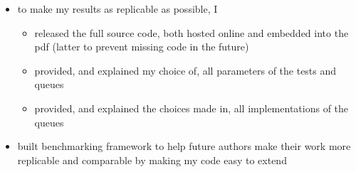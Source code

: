 \begin{itemize}
    \item to make my results as replicable as possible, I
        \begin{itemize}
            \item released the full source code, both hosted online and embedded into the pdf
                (latter to prevent missing code in the future)
            \item provided, and explained my choice of, all parameters of the tests and queues
            \item provided, and explained the choices made in, all implementations of the queues
        \end{itemize}
    \item built benchmarking framework to help future authors make their work more replicable and comparable
        by making my code easy to extend
\end{itemize}
